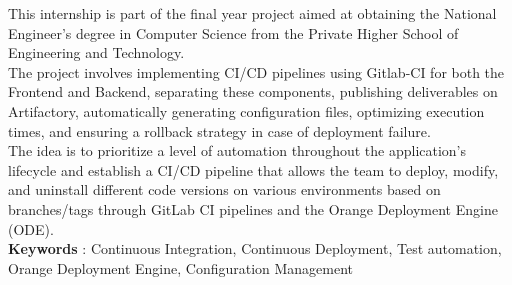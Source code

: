 \begin{spacing}{1.2}
\vspace{0.6cm}

This internship is part of the final year project aimed at obtaining the National Engineer's degree in Computer Science from the Private Higher School of Engineering and Technology.\\
The project involves implementing CI/CD pipelines using Gitlab-CI for both the Frontend and Backend, separating these components, publishing deliverables on Artifactory, automatically generating configuration files, optimizing execution times, and ensuring a rollback strategy in case of deployment failure.\\

The idea is to prioritize a level of automation throughout the application's lifecycle and establish a CI/CD pipeline that allows the team to deploy, modify, and uninstall different code versions on various environments based on branches/tags through GitLab CI pipelines and the Orange Deployment Engine (ODE).\\

\textbf{Keywords} : Continuous Integration, Continuous Deployment, Test automation, Orange Deployment Engine, Configuration Management



\emergencystretch=2cm

\end{spacing}
